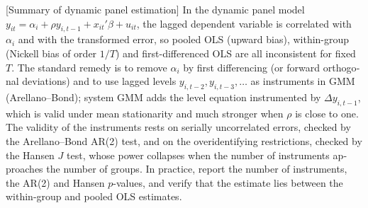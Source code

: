 \begin{english}[Summary of dynamic panel estimation]
In the dynamic panel model $y_{it}=\alpha_i+\rho y_{i,t-1}+x_{it}'\beta+u_{it}$, the lagged dependent variable is correlated with $\alpha_i$ and with the transformed error, so pooled OLS (upward bias), within-group (Nickell bias of order $1/T$) and first-differenced OLS are all inconsistent for fixed $T$. The standard remedy is to remove $\alpha_i$ by first differencing (or forward orthogonal deviations) and to use lagged levels $y_{i,t-2},y_{i,t-3},\dots$ as instruments in GMM (Arellano--Bond); system GMM adds the level equation instrumented by $\Delta y_{i,t-1}$, which is valid under mean stationarity and much stronger when $\rho$ is close to one. The validity of the instruments rests on serially uncorrelated errors, checked by the Arellano--Bond AR(2) test, and on the overidentifying restrictions, checked by the Hansen $J$ test, whose power collapses when the number of instruments approaches the number of groups. In practice, report the number of instruments, the AR(2) and Hansen $p$-values, and verify that the estimate lies between the within-group and pooled OLS estimates.
\end{english}
